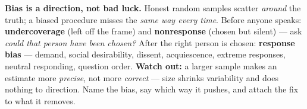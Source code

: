 \documentclass[12pt]{article}
\begin{document}
\vspace{0.14in}

\begin{remindbox}
\small
\textbf{Bias is a direction, not bad luck.} Honest random samples scatter \emph{around} the
truth; a biased procedure misses the \emph{same way every time}. Before anyone speaks:
\textbf{undercoverage} (left off the frame) and \textbf{nonresponse} (chosen but silent) ---
ask \emph{could that person have been chosen?} After the right person is chosen:
\textbf{response bias} --- demand, social desirability, dissent, acquiescence, extreme
responses, neutral responding, question order. \textbf{Watch out:} a larger sample makes an
estimate more \emph{precise}, not more \emph{correct} --- size shrinks variability and does
nothing to direction. Name the bias, say which way it pushes, and attach the fix to what it
removes.
\end{remindbox}
\end{document}
